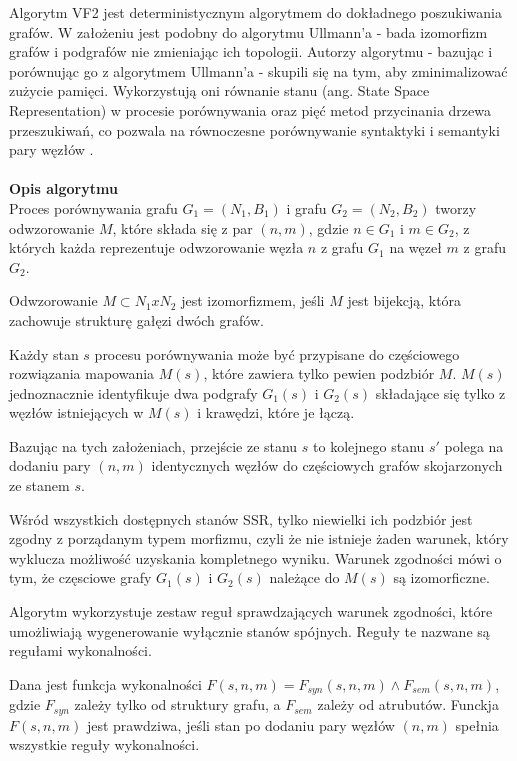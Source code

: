 \documentclass[a4paper,12pt]{article}
\begin{document}
Algorytm VF2 jest deterministycznym algorytmem do dokładnego poszukiwania grafów. W założeniu jest podobny do algorytmu Ullmann'a - bada izomorfizm grafów i podgrafów nie zmieniając ich topologii. Autorzy algorytmu - bazując i porównując go z algorytmem Ullmann'a - skupili się na tym, aby zminimalizować zużycie pamięci. Wykorzystują oni równanie stanu (ang. State Space Representation) w procesie porównywania oraz pięć metod przycinania drzewa przeszukiwań, co pozwala na równoczesne porównywanie syntaktyki i semantyki pary węzłów \cite{vf2}.
\\ \\
\textbf{Opis algorytmu}
\\
Proces porównywania grafu $G_1 = (N_1, B_1)$ i grafu $G_2 = (N_2, B_2)$ tworzy odwzorowanie $M$, które składa się z par $(n,m)$, gdzie $n \in G_1$ i $m \in G_2$, z których każda reprezentuje odwzorowanie węzła $n$ z grafu $G_1$ na węzeł $m$ z grafu $G_2$.

Odwzorowanie $M \subset N_1 x N_2$ jest izomorfizmem, jeśli $M$ jest bijekcją, która zachowuje strukturę gałęzi dwóch grafów.

Każdy stan $s$ procesu porównywania może być przypisane do częściowego rozwiązania mapowania $M(s)$, które zawiera tylko pewien podzbiór $M$. $M(s)$ jednoznacznie identyfikuje dwa podgrafy $G_1(s)$ i $G_2(s)$ składające się tylko z węzłów istniejących w $M(s)$ i krawędzi, które je łączą.

Bazując na tych założeniach, przejście ze stanu $s$ to kolejnego stanu $s'$ polega na dodaniu pary $(n,m)$ identycznych węzłów do częściowych grafów skojarzonych ze stanem $s$.

Wśród wszystkich dostępnych stanów SSR, tylko niewielki ich podzbiór jest zgodny z porządanym typem morfizmu, czyli że nie istnieje żaden warunek, który wyklucza możliwość uzyskania kompletnego wyniku.
Warunek zgodności mówi o tym, że częsciowe grafy $G_1(s)$ i $G_2(s)$ należące do $M(s)$ są izomorficzne.

Algorytm wykorzystuje zestaw reguł sprawdzających warunek zgodności, które umożliwiają wygenerowanie wyłącznie stanów spójnych. Reguły te nazwane są regułami wykonalności.

Dana jest funkcja wykonalności $F(s,n,m) = F_{syn}(s,n,m) \wedge F_{sem}(s,n,m)$, gdzie $F_{syn}$ zależy tylko od struktury grafu, a $F_{sem}$ zależy od atrubutów.
Funckja $F(s,n,m)$ jest prawdziwa, jeśli stan po dodaniu pary węzłów $(n,m)$ spełnia wszystkie reguły wykonalności.
\end{document}
